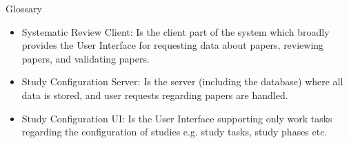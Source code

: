 \begin{section}{Glossary}

\begin{itemize}
\item Systematic Review Client: Is the client part of the system which broadly provides the User Interface for requesting data about papers, reviewing papers, and validating papers.
\item Study Configuration Server: Is the server (including the database) where all data is stored, and user requests regarding papers are handled.
\item Study Configuration UI: Is the User Interface supporting only work tasks regarding the configuration of studies e.g. study tasks, study phases etc.
\end{itemize}

\end{section}